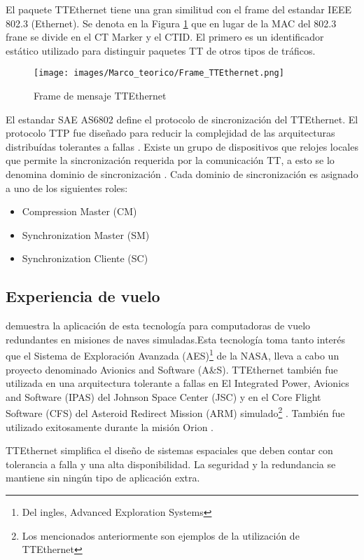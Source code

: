 El paquete TTEthernet tiene una gran similitud con el frame del estandar IEEE 802.3 (Ethernet). Se denota en la Figura \ref{fig:Frame_TTEthernet} que en lugar de la MAC del 802.3 frane se divide en el CT Marker y el CTID. El primero es un identificador estático utilizado para distinguir paquetes \ac{TT} de otros tipos de tráficos.

\begin{figure}[h]
 \centering
 \texttt{[image: images/Marco\_teorico/Frame\_TTEthernet.png]}
  \caption{Frame de mensaje TTEthernet}
\label{fig:Frame_TTEthernet}
\end{figure}

El estandar SAE AS6802 define el protocolo de sincronización del TTEthernet. El protocolo TTP fue diseñado para reducir la complejidad de las arquitecturas distribuídas tolerantes a fallas \citep{TTTechWeb}. Existe un grupo de dispositivos que relojes locales que permite la sincronización requerida por la comunicación \ac{TT}, a esto se lo denomina dominio de sincronización \citep{Loveless15}. Cada dominio de sincronización es asignado a uno de los siguientes roles:
\begin{itemize}
	\item Compression Master (CM)
	\item Synchronization Master (SM)
	\item Synchronization Cliente (SC)
\end{itemize}

\subsection{Experiencia de vuelo}
\cite{Loveless15} demuestra la aplicación de esta tecnología para computadoras de vuelo redundantes en misiones de naves simuladas.Esta tecnología toma tanto interés que el Sistema de Exploración Avanzada (AES)\footnote{Del ingles, Advanced Exploration Systems} de la \ac{NASA}, lleva a cabo un proyecto denominado Avionics and Software (A&S). TTEthernet también fue utilizada en una arquitectura tolerante a fallas en El Integrated Power, Avionics and Software (IPAS)  del Johnson Space Center (JSC) y en el Core Flight Software (CFS) del Asteroid Redirect Mission (ARM) simulado\footnote{Los mencionados anteriormente son ejemplos de la utilización de TTEthernet} \citep{Loveless15}. También fue utilizado exitosamente durante la misión Orion \citep{TTTechOrion} .

TTEthernet simplifica el diseño de sistemas espaciales que deben contar con tolerancia a falla y una alta disponibilidad. La seguridad y la redundancia se mantiene sin ningún tipo de aplicación extra.
